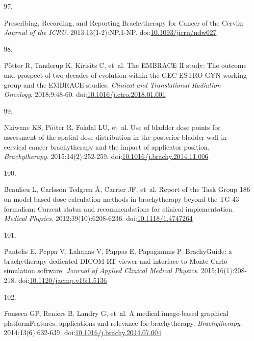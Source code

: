 \documentclass[
  a4paper,
]{scrreprt}
\newlength{\cslhangindent}
\newlength{\csllabelwidth}
\newlength{\cslentryspacingunit} %
\newenvironment{CSLReferences}[2] %
 {%
  \setlength{\parindent}{0pt}
  \ifodd #1
  \let\oldpar\par
  \def\par{\hangindent=\cslhangindent\oldpar}
  \fi
  \setlength{\parskip}{#2\cslentryspacingunit}
 }%
 {}
\newcommand{\CSLLeftMargin}[1]{\parbox[t]{\csllabelwidth}{#1}}
\newcommand{\CSLRightInline}[1]{\parbox[t]{\linewidth - \csllabelwidth}{#1}\break}
\begin{document}
\begin{CSLReferences}{0}{0}
\leavevmode{}%
\CSLLeftMargin{97. }%
\CSLRightInline{Prescribing, Recording, and Reporting Brachytherapy for
Cancer of the Cervix: \emph{Journal of the ICRU}. 2013;13(1-2):NP.1-NP.
doi:\href{https://doi.org/10.1093/jicru/ndw027}{10.1093/jicru/ndw027}}

\leavevmode{}%
\CSLLeftMargin{98. }%
\CSLRightInline{Pötter R, Tanderup K, Kirisits C, et~al. The EMBRACE II
study: The outcome and prospect of two decades of evolution within the
GEC-ESTRO GYN working group and the EMBRACE studies. \emph{Clinical and
Translational Radiation Oncology}. 2018;9:48-60.
doi:\href{https://doi.org/10.1016/j.ctro.2018.01.001}{10.1016/j.ctro.2018.01.001}}

\leavevmode{}%
\CSLLeftMargin{99. }%
\CSLRightInline{Nkiwane KS, Pötter R, Fokdal LU, et~al. Use of bladder
dose points for assessment of the spatial dose distribution in the
posterior bladder wall in cervical cancer brachytherapy and the impact
of applicator position. \emph{Brachytherapy}. 2015;14(2):252-259.
doi:\href{https://doi.org/10.1016/j.brachy.2014.11.006}{10.1016/j.brachy.2014.11.006}}

\leavevmode{}%
\CSLLeftMargin{100. }%
\CSLRightInline{Beaulieu L, Carlsson Tedgren Å, Carrier JF, et~al.
Report of the Task Group 186 on model{-}based dose calculation methods
in brachytherapy beyond the TG{-}43 formalism: Current status and
recommendations for clinical implementation. \emph{Medical Physics}.
2012;39(10):6208-6236.
doi:\href{https://doi.org/10.1118/1.4747264}{10.1118/1.4747264}}

\leavevmode{}%
\CSLLeftMargin{101. }%
\CSLRightInline{Pantelis E, Peppa V, Lahanas V, Pappas E, Papagiannis P.
BrachyGuide: a brachytherapy{-}dedicated DICOM RT viewer and interface
to Monte Carlo simulation software. \emph{Journal of Applied Clinical
Medical Physics}. 2015;16(1):208-218.
doi:\href{https://doi.org/10.1120/jacmp.v16i1.5136}{10.1120/jacmp.v16i1.5136}}

\leavevmode{}%
\CSLLeftMargin{102. }%
\CSLRightInline{Fonseca GP, Reniers B, Landry G, et~al. A medical
image-based graphical platform{\textemdash}Features, applications and
relevance for brachytherapy. \emph{Brachytherapy}. 2014;13(6):632-639.
doi:\href{https://doi.org/10.1016/j.brachy.2014.07.004}{10.1016/j.brachy.2014.07.004}}


\end{CSLReferences}
\end{document}
